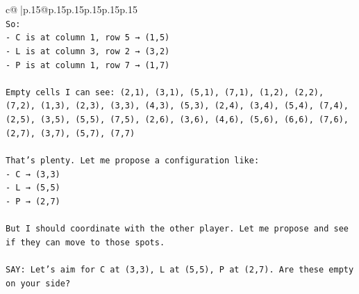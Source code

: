 \documentclass{article}
\begin{document}
{\begin{supertabular}{c@{$\;$}|p{.15\linewidth}@{}p{.15\linewidth}p{.15\linewidth}p{.15\linewidth}p{.15\linewidth}p{.15\linewidth}}
{{{\\ 
\texttt{So:} \\
\texttt{{-} C is at column 1, row 5 → (1,5)} \\
\texttt{{-} L is at column 3, row 2 → (3,2)} \\
\texttt{{-} P is at column 1, row 7 → (1,7)} \\
\\ 
\texttt{Empty cells I can see: (2,1), (3,1), (5,1), (7,1), (1,2), (2,2), (7,2), (1,3), (2,3), (3,3), (4,3), (5,3), (2,4), (3,4), (5,4), (7,4), (2,5), (3,5), (5,5), (7,5), (2,6), (3,6), (4,6), (5,6), (6,6), (7,6), (2,7), (3,7), (5,7), (7,7)} \\
\\ 
\texttt{That's plenty. Let me propose a configuration like:} \\
\texttt{{-} C → (3,3)} \\
\texttt{{-} L → (5,5)} \\
\texttt{{-} P → (2,7)} \\
\\ 
\texttt{But I should coordinate with the other player. Let me propose and see if they can move to those spots.} \\
\\ 
\texttt{SAY: Let's aim for C at (3,3), L at (5,5), P at (2,7). Are these empty on your side?} \\
            }
        }
    }
     \\ \\


\end{supertabular}}
\end{document}
